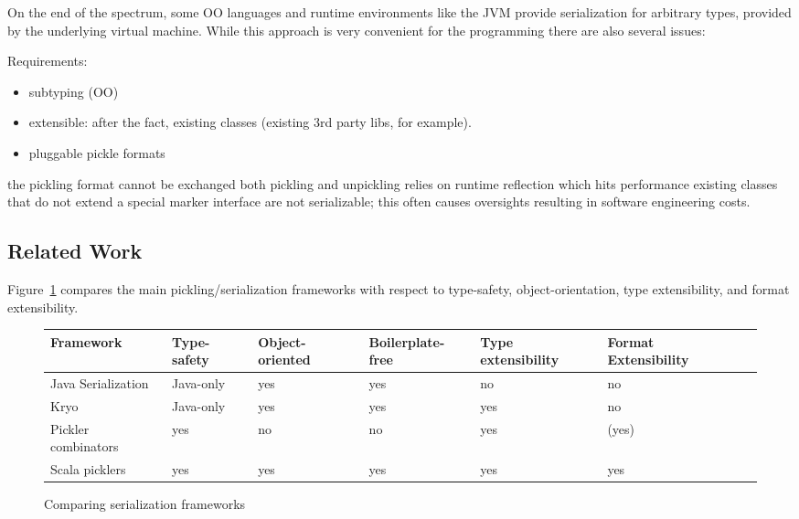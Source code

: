 \documentclass[preprint,10pt]{sigplanconf}
\begin{document}
On the end of the spectrum, some OO languages and runtime environments like the JVM provide serialization for arbitrary types, provided by the underlying virtual machine. While this approach is very convenient for the programming there are also several issues:

Requirements:

\begin{itemize}
  \item subtyping (OO)
  \item extensible: after the fact, existing classes (existing 3rd party libs, for example).
  \item pluggable pickle formats
\end{itemize}

the pickling format cannot be exchanged
both pickling and unpickling relies on runtime reflection which hits performance
existing classes that do not extend a special marker interface are not serializable; this often causes oversights resulting in software engineering costs.


\subsection{Related Work}

Figure~\ref{fig:comparison} compares the main pickling/serialization
frameworks with respect to type-safety, object-orientation, type
extensibility, and format extensibility.

\begin{figure}[t]
\begin{tabular}{|l|l|l|l|l|l|l|}
\hline
Framework           & Type-safety  & Object-oriented  & Boilerplate-free  & Type extensibility  & Format Extensibility \\
\hline
Java Serialization  & Java-only    & yes              & yes          & no                  & no \\
Kryo                & Java-only    & yes              & yes          & yes                 & no \\
Pickler combinators & yes          & no               & no           & yes                 & (yes) \\
Scala picklers      & yes          & yes              & yes          & yes                 & yes \\
\hline
\end{tabular}

\caption{Comparing serialization frameworks}\label{fig:comparison}
\end{figure}
\end{document}
